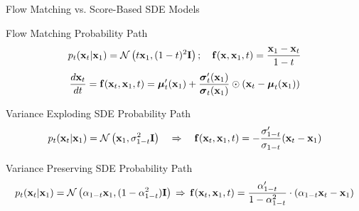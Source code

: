 \documentclass{beamer}
\begin{document}
\begin{frame}{Flow Matching vs. Score-Based SDE Models}
	\begin{block}{Flow Matching Probability Path}
		\vspace{-0.3cm}
		\[
			p_t(\mathbf{x}_t | \mathbf{x}_1) = \mathcal{N}\left(t \mathbf{x}_1, (1-t)^2 \mathbf{I}\right); \quad \mathbf{f}(\mathbf{x}, \mathbf{x}_1, t) = \frac{\mathbf{x}_1  - \mathbf{x}_t}{1-t}
		\]
		\vspace{-0.3cm}
		\[
	 		\frac{d\mathbf{x}_t}{dt} = \mathbf{f}(\mathbf{x}_t, \mathbf{x}_1, t) =  \boldsymbol{\mu}_t'(\mathbf{x}_1) + \frac{\boldsymbol{\sigma}_t'(\mathbf{x}_1)}{\boldsymbol{\sigma}_t(\mathbf{x}_1)} \odot (\mathbf{x}_t - \boldsymbol{\mu}_t(\mathbf{x}_1))
		\]
		\eqpause
	\end{block}
	\begin{block}{Variance Exploding SDE Probability Path}
		\vspace{-0.5cm}
		\[
				p_t(\mathbf{x}_t | \mathbf{x}_1) = \mathcal{N}\left(\mathbf{x}_1, \sigma^2_{1-t}  \mathbf{I}\right) \quad \Rightarrow \quad 
				\mathbf{f}(\mathbf{x}_t, \mathbf{x}_1, t) = - \frac{\sigma'_{1-t}}{\sigma_{1-t}} (\mathbf{x}_t - \mathbf{x}_1)
		\]
		\vspace{-0.3cm}
	\end{block}
	\eqpause
	\begin{block}{Variance Preserving SDE Probability Path}
		\vspace{-0.5cm}
		{\small
		\[
			p_t(\mathbf{x}_t | \mathbf{x}_1) = \mathcal{N}\left(\alpha_{1-t}  \mathbf{x}_1, (1 - \alpha^2_{1-t})  \mathbf{I} \right)  \, \Rightarrow \, 
		\mathbf{f}(\mathbf{x}_t, \mathbf{x}_1, t) = \frac{\alpha'_{1-t}}{1 - \alpha^2_{1-t}}\cdot \left(\alpha_{1-t}  \mathbf{x}_t - \mathbf{x}_1\right)
		\]
		}
	\end{block}
\end{frame}
\end{document}
